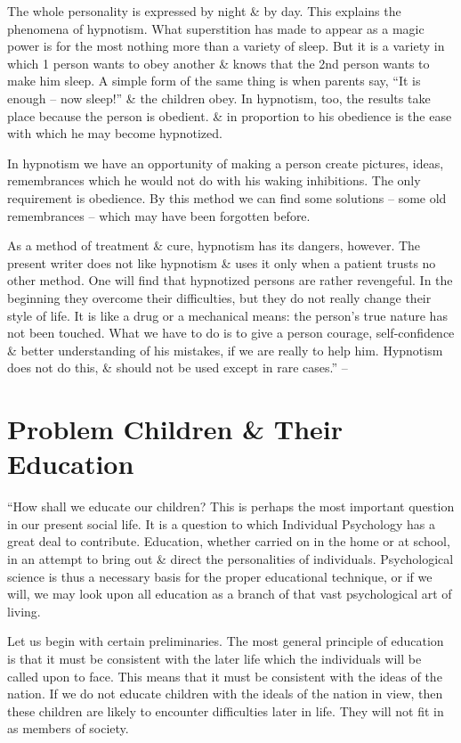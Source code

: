 \documentclass{article}
\numberwithin{equation}{section}
\begin{document}
The whole personality is expressed by night \& by day. This explains the phenomena of hypnotism. What superstition has made to appear as a magic power is for the most nothing more than a variety of sleep. But it is a variety in which 1 person wants to obey another \& knows that the 2nd person wants to make him sleep. A simple form of the same thing is when parents say, ``It is enough -- now sleep!'' \& the children obey. In hypnotism, too, the results take place because the person is obedient. \& in proportion to his obedience is the ease with which he may become hypnotized.

In hypnotism we have an opportunity of making a person create pictures, ideas, remembrances which he would not do with his waking inhibitions. The only requirement is obedience. By this method we can find some solutions -- some old remembrances -- which may have been forgotten before.

As a method of treatment \& cure, hypnotism has its dangers, however. The present writer does not like hypnotism \& uses it only when a patient trusts no other method. One will find that hypnotized persons are rather revengeful. In the beginning they overcome their difficulties, but they do not really change their style of life. It is like a drug or a mechanical means: the person's true nature has not been touched. What we have to do is to give a person courage, self-confidence \& better understanding of his mistakes, if we are really to help him. Hypnotism does not do this, \& should not be used except in rare cases.'' -- \cite[pp. 154--172]{Adler2013}


\section{Problem Children \& Their Education}
``How shall we educate our children? This is perhaps the most important question in our present social life. It is a question to which Individual Psychology has a great deal to contribute. Education, whether carried on in the home or at school, in an attempt to bring out \& direct the personalities of individuals. Psychological science is thus a necessary basis for the proper educational technique, or if we will, we may look upon all education as a branch of that vast psychological art of living.

Let us begin with certain preliminaries. The most general principle of education is that it must be consistent with the later life which the individuals will be called upon to face. This means that it must be consistent with the ideas of the nation. If we do not educate children with the ideals of the nation in view, then these children are likely to encounter difficulties later in life. They will not fit in as members of society.
\end{document}
